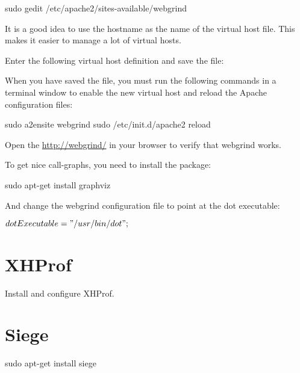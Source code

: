 \documentclass[draft,ebook,10pt,twoside,openright]{memoir}
\begin{document}
\begin{squashboxcommand}
sudo gedit /etc/apache2/sites-available/webgrind
\end{squashboxcommand}

It is a good idea to use the hostname as the name of the virtual host file. This makes it easier to manage a lot of virtual hosts.

Enter the following virtual host definition and save the file:

\begin{squashboxoutput}
\end{squashboxoutput}

When you have saved the file, you must run the following commands in a terminal window to enable the new virtual host and reload the Apache configuration files:

\begin{squashboxcommand}
sudo a2ensite webgrind
sudo /etc/init.d/apache2 reload
\end{squashboxcommand}

Open the \url{http://webgrind/} in your browser to verify that webgrind works.

  To get nice call-graphs, you need to install the package:

\begin{squashboxcommand}
sudo apt-get install graphviz
\end{squashboxcommand}

And change the webgrind configuration file to point at the dot executable:

\begin{squashboxoutput}
$dotExecutable = "/usr/bin/dot";
$
\end{squashboxoutput}


\section{XHProf}

Install and configure XHProf.

\section{Siege}

\begin{squashboxcommand}
sudo apt-get install siege
\end{squashboxcommand}
\end{document}
